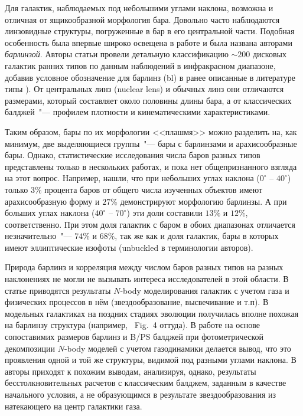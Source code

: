 \documentclass{trlnotes}
\begin{document}
Для галактик, наблюдаемых под небольшими углами наклона, возможна и отличная от ящикообразной морфология бара.
Довольно часто наблюдаются линзовидные структуры, погруженные в бар в его центральной части. Подобная особенность
была впервые широко освещена в работе \citet{laurikainen2011} и была названа авторами \emph{барлинзой}.
Авторы статьи провели детальную классификацию $\sim\!200$ дисковых галактик ранних типов по данным наблюдений в
инфракрасном диапазоне, добавив условное обозначение для барлинз (bl) в ранее описанные в литературе типы
\citep{devaucouleurs1959,buta2010}). От центральных линз (nuclear lens) и обычных линз они отличаются
размерами, который составляет около половины длины бара, а от классических балджей~"--- профилем плотности и кинематическими
характеристиками. 

Таким образом, бары по их морфологии <<плашмя>> можно разделить на, как минимум, две выделяющиеся группы~"--- бары с
барлинзами и арахисообразные бары. Однако, статистические исследования числа баров разных типов представлены только в
нескольких работах, и пока нет общепризнанного взгляда на этот вопрос. Например, \citet{li2017a} нашли, что при  небольших углах наклона ($0^\circ$ -- $40^\circ$) только $3\%$ процента баров от общего числа изученных объектов имеют арахисообразную форму и $27\%$ демонстрируют морфологию барлинзы. А при больших углах наклона ($40^\circ$
-- $70^\circ$) эти доли составили $13\%$ и $12\%$,  соответственно. При этом доля галактик с баром в обоих
диапазонах отличается незначительно~"--- $74\%$ и $68\%$, так же как и доля галактик, бары в которых имеют
эллиптические изофоты (unbuckled в терминологии авторов). 

Природа барлинз и корреляция между числом баров разных типов на разных наклонениях не могли не вызывать интереса
исследователей в этой области. В статье \citet{athanassoula2013a} приводятся результаты $N$-body моделирования галактик с учетом газа и физических процессов 
в нём (звездообразование, высвечивание и т.п). В модельных галактиках на поздних стадиях эволюции  получилась вполне похожая на барлинзу структура (например, ~Fig.~4 оттуда). В работе  \citet{athanassoula2015} на основе сопоставимих размеров барлинз и B/PS балджей при фотометрической 
декомпозиции $N$-body моделей с учетом газодинамики делается вывод, что это проявления одной и той же структуры, 
видимой под разными углами наклона. В \cite{salo2017} авторы приходят к похожим выводам, анализируя, 
однако, результаты бесстолкновительных расчетов с классическим балджем, заданным в качестве начального условия, а не 
образующимся в результате звездообразования из  натекающего на центр галактики газа. 
\end{document}
